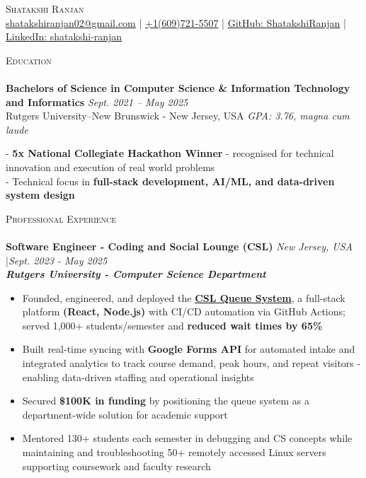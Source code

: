\documentclass[a4paper]{article}
\newcommand{\lineunder} {
    \vspace*{-8pt} \\
    \hspace*{-18pt} \hrulefill \\
}
\newcommand{\header} [1] {
    {\hspace*{-18pt}\vspace*{6pt} \textsc{#1}}
    \vspace*{-6pt} \lineunder
}
\begin{document}
\vspace*{-35pt}

\begin{center}
{\Large \scshape Shatakshi Ranjan}\\
\vspace{2pt}
\small{ \href{mailto:shatakshiranjan02@gmail.com}{shatakshiranjan02@gmail.com}  | \href{tel:6097215507}{+1(609)721-5507} | \href{https://github.com/ShatakshiRanjan}{GitHub: ShatakshiRanjan}  | \href{https://www.linkedin.com/in/shatakshi-ranjan/}{LinkedIn: shatakshi-ranjan}}\\
\end{center}
\vspace{-4pt} 

%
%
\header{Education}
\textbf{Bachelors of Science in Computer Science \& Information Technology and Informatics} \hfill \textit{Sept. 2021 – May 2025} \\
Rutgers University–New Brunswick - New Jersey, USA \hfill \textit{GPA: 3.76, magna cum laude}

  \vspace{1mm}
  - \textbf{5x National Collegiate Hackathon Winner} - recognised for technical innovation and execution of real world problems \\
  - Technical focus in \textbf{full-stack development, AI/ML, and data-driven system design}  \\

  \vspace{1mm}
%
%
\header{Professional Experience}

\textbf{Software Engineer - Coding and Social Lounge (CSL)} \hfill \textit{New Jersey, USA} |\textit{Sept. 2023 - May 2025} \\
\textit{\textbf{Rutgers University - Computer Science Department}}
\vspace{-2.5mm}
\begin{itemize} \itemsep -4pt 
    \item Founded, engineered, and deployed the \textbf{\href{https://drive.google.com/file/d/1x0PIBHbKDmxw2qpGwwiSsk5e5cq8U_7k/view?usp=sharing}{CSL Queue System}}, a full-stack platform \textbf{(React, Node.js)} with CI/CD automation via GitHub Actions; served 1,000+ students/semester and \textbf{reduced wait times by 65\%}
    \item Built real-time syncing with \textbf{Google Forms API} for automated intake and integrated analytics to track course demand, peak hours, and repeat visitors - enabling data-driven staffing and operational insights
    \item Secured \textbf{\$100K in funding} by positioning the queue system as a department-wide solution for academic support 
    \item Mentored 130+ students each semester in debugging and CS concepts while maintaining and troubleshooting 50+ remotely accessed Linux servers supporting coursework and faculty research
\end{itemize}
\vspace{-2mm}
\end{document}
